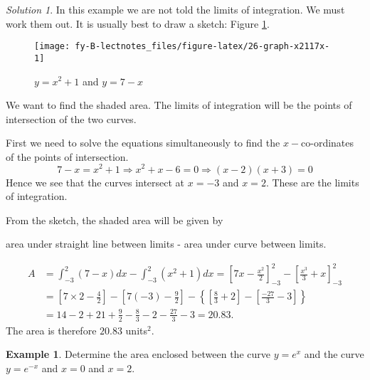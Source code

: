 \documentclass[
  11pt,
  oneside]{book}
\newcommand{\slide}{}
\theoremstyle{definition}
\theoremstyle{definition}
\newtheorem{example}{Example}[chapter]
\theoremstyle{definition}
\theoremstyle{definition}
\theoremstyle{remark}
\newtheorem*{solution}{Solution}
\begin{document}
\begin{solution}
\leavevmode

In this example we are not told the limits of integration. We must work them out. It is usually best to draw a sketch: Figure \ref{fig:26-graph-x2117x}.

\begin{figure}

{\centering \texttt{[image: fy-B-lectnotes\_files/figure-latex/26-graph-x2117x-1]} 

}

\caption{$y=x^2+1$ and $y=7-x$}\label{fig:26-graph-x2117x}
\end{figure}

We want to find the shaded area. The limits of integration will be the points of intersection of the two curves.

First we need to solve the equations simultaneously to find the \(x-\)co-ordinates of the points of intersection.
\[
7-x=x^2+1\Rightarrow x^2+x-6=0\Rightarrow (x-2)(x+3)=0
\]
Hence we see that the curves intersect at \(x=-3\) and \(x=2\). These are the limits of integration.

From the sketch, the shaded area will be given by

\begin{center}
area under straight line between limits - area under curve between limits.
\end{center}

\begin{align*}
A&=\int_{-3}^2(7-x)dx - \int_{-3}^2(x^2+1)dx = \left[7x-\frac{x^2}2\right]_{-3}^2 - \left[\frac{x^3}3+x\right]_{-3}^2\\
&=\left[7\times2-\frac{4}2\right]-\left[7(-3)-\frac92\right]-\left\{\left[\frac{8}3+2\right]-\left[\frac{-27}3-3\right]\right\}\\
&=14-2+21+\frac 92-\frac83-2-\frac{27}3-3=20.83.
\end{align*}
The area is therefore \(20.83\) units\(^2\).

\end{solution}

\slide

\begin{example}
Determine the area enclosed between the curve \(y=e^x\) and the curve \(y=e^{-x}\) and \(x=0\) and \(x=2\).
\end{example}
\end{document}
